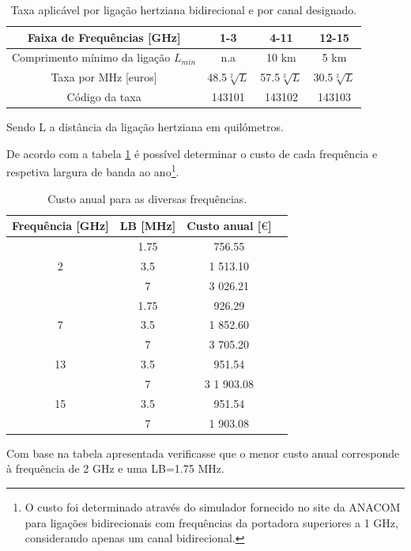 \begin{table}[H]
\centering
\begin{tabular}{|c|ccc|}
\hline
Faixa de Frequências [GHz] & 1-3 & 4-11 & 12-15\\
\hline
Comprimento mínimo da ligação $L_{min}$ & n.a & 10 km &5 km\\
\hline
Taxa por MHz [euros] & 48.5$\sqrt[2]{L}$ & 57.5$\sqrt[2]{L}$& 30.5$\sqrt[2]{L}$\\
\hline
Código da taxa & 143101 & 143102 & 143103\\
\hline
\end{tabular}
\caption{Taxa aplicável por ligação hertziana bidirecional e por canal designado.}
\label{taxa}
\end{table}
Sendo L a distância da ligação hertziana em quilómetros. 

De acordo com a tabela \ref{taxa} é possível determinar o custo de cada frequência e respetiva largura de banda ao ano\footnote{O custo foi determinado através do simulador fornecido no site da ANACOM para ligações bidirecionais com frequências da portadora superiores a 1 GHz, considerando apenas um canal bidirecional.}.
\begin{table}[H]
\centering
\begin{tabular}{|c|c|c|c|}
\hline
Frequência [GHz] & LB [MHz] & Custo anual [$\euro$]\\
\hline
 & 1.75 & 756.55\\
2 & 3.5 & 1 513.10\\
 & 7 & 3 026.21\\
 & 1.75 & 926.29\\
\hline
7 & 3.5 & 1 852.60\\
 & 7 & 3 705.20 \\
\hline
13 & 3.5 & 951.54\\
 & 7 & 3 1 903.08 \\
\hline
15 & 3.5 & 951.54\\
 & 7 & 1 903.08 \\
\hline
\end{tabular}
\caption{Custo anual para as diversas frequências.}
\label{custo_ano}
\end{table}
Com base na tabela apresentada verificasse que o menor custo anual corresponde à frequência de 2 GHz e uma LB=1.75 MHz. 

